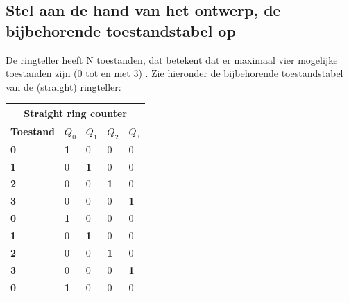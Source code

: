 \documentclass[12pt]{article}
\begin{document}
\subsection{Stel aan de hand van het ontwerp, de bijbehorende toestandstabel op}
\label{lol}
De ringteller heeft N toestanden, dat betekent dat er maximaal vier mogelijke toestanden zijn (0 tot en met 3) \cite{1lol}. 
Zie hieronder de bijbehorende toestandstabel van de (straight) ringteller:
\begin{table}[h]
    \centering
\begin{tabular}{|lllll|}
\hline
\multicolumn{5}{|c|}{\textbf{Straight ring counter}}                                                                                                 \\ \hline
\multicolumn{1}{|l|}{\textbf{Toestand}} & \multicolumn{1}{l|}{$Q_0$} & \multicolumn{1}{l|}{$Q_1$} & \multicolumn{1}{l|}{$Q_2$} & $Q_3$ \\ \hline
\multicolumn{1}{|l|}{\textbf{0}} & \multicolumn{1}{l|}{\textbf{1}} & \multicolumn{1}{l|}{0}          & \multicolumn{1}{l|}{0}          & 0          \\ \hline
\multicolumn{1}{|l|}{\textbf{1}} & \multicolumn{1}{l|}{0}          & \multicolumn{1}{l|}{\textbf{1}} & \multicolumn{1}{l|}{0}          & 0          \\ \hline
\multicolumn{1}{|l|}{\textbf{2}} & \multicolumn{1}{l|}{0}          & \multicolumn{1}{l|}{0}          & \multicolumn{1}{l|}{\textbf{1}} & 0          \\ \hline
\multicolumn{1}{|l|}{\textbf{3}} & \multicolumn{1}{l|}{0}          & \multicolumn{1}{l|}{0}          & \multicolumn{1}{l|}{0}          & \textbf{1} \\ \hline
\multicolumn{1}{|l|}{\textbf{0}} & \multicolumn{1}{l|}{\textbf{1}} & \multicolumn{1}{l|}{0}          & \multicolumn{1}{l|}{0}          & 0          \\ \hline
\multicolumn{1}{|l|}{\textbf{1}} & \multicolumn{1}{l|}{0}          & \multicolumn{1}{l|}{\textbf{1}} & \multicolumn{1}{l|}{0}          & 0          \\ \hline
\multicolumn{1}{|l|}{\textbf{2}} & \multicolumn{1}{l|}{0}          & \multicolumn{1}{l|}{0}          & \multicolumn{1}{l|}{\textbf{1}} & 0          \\ \hline
\multicolumn{1}{|l|}{\textbf{3}} & \multicolumn{1}{l|}{0}          & \multicolumn{1}{l|}{0}          & \multicolumn{1}{l|}{0}          & \textbf{1} \\ \hline
\multicolumn{1}{|l|}{\textbf{0}} & \multicolumn{1}{l|}{\textbf{1}} & \multicolumn{1}{l|}{0}          & \multicolumn{1}{l|}{0}          & 0          \\ \hline
\end{tabular}
\end{table}
\pagebreak
\end{document}

